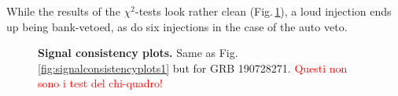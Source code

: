 \documentclass[binding=0.6cm, LaM]{sapthesis}
\newcommand{\fpg}[1]{\textcolor{red}{#1} }
\begin{document}
        While the results of the $\chi^2$-tests look rather clean (Fig.\,\ref{fig:scplots2_final}), a loud injection ends up being bank-vetoed,
        as do six injections in the case of the auto veto.
        \begin{figure}[!t]
          \noindent
          \label{scplots2_final}
          \centering
          \caption{\textbf{Signal consistency plots.} Same as Fig.\,\ref{fig:signalconsistencyplots1} but for GRB 190728271.  \fpg{Questi non sono i test del chi-quadro!}}
          \label{fig:scplots2_final}
        \end{figure}
\end{document}
